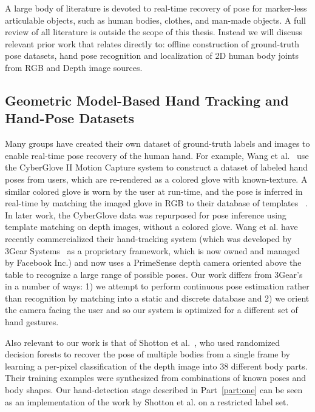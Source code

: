 
A large body of literature is devoted to real-time recovery of pose for marker-less articulable objects, such as human bodies, clothes, and man-made objects. A full review of all literature is outside the scope of this thesis. Instead we will discuss relevant prior work that relates directly to: offline construction of ground-truth pose datasets, hand pose recognition and localization of 2D human body joints from RGB and Depth image sources.

\subsection*{Geometric Model-Based Hand Tracking and Hand-Pose Datasets}

Many groups have created their own dataset of ground-truth labels and images to enable real-time pose recovery of the human hand. For example, Wang et al.~\cite{wang_pop_6d_hands} use the CyberGlove II Motion Capture system to construct a dataset of labeled hand poses from users, which are re-rendered as a colored glove with known-texture. A similar colored glove is worn by the user at run-time, and the pose is inferred in real-time by matching the imaged glove in RGB to their database of templates ~\cite{wang_pop_color_glove}. In later work, the CyberGlove data was repurposed for pose inference using template matching on depth images, without a colored glove. Wang et al. have recently commercialized their hand-tracking system (which was developed by 3Gear Systems~\cite{3Gear} as a proprietary framework, which is now owned and managed by Facebook Inc.) and now uses a PrimeSense depth camera oriented above the table to recognize a large range of possible poses. Our work differs from 3Gear's in a number of ways: 1) we attempt to perform continuous pose estimation rather than recognition by matching into a static and discrete database and 2) we orient the camera facing the user and so our system is optimized for a different set of hand gestures.

Also relevant to our work is that of Shotton et al.~\cite{shotton2013real}, who used randomized decision forests to recover the pose of multiple bodies from a single frame by learning a per-pixel classification of the depth image into 38 different body parts. Their training examples were synthesized from combinations of known poses and body shapes. Our hand-detection stage described in Part~\ref{part:one} can be seen as an implementation of the work by Shotton et al. on a restricted label set.

